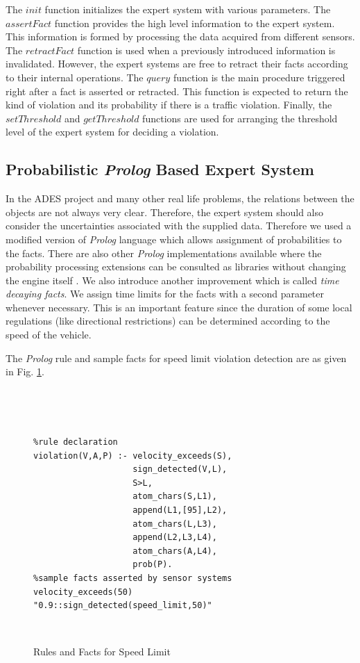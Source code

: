 \documentclass[letterpaper, 10 pt, conference]{ieeeconf}
\newenvironment{mylisting}
{~\par~\begin{list}{}{\setlength{\leftmargin}{1em}}\item\scriptsize\bfseries}
{\end{list}~\par}
\begin{document}
The $init$ function initializes the expert system with various parameters. The $assertFact$ function provides the high level information to the expert system. This information is formed by processing the data acquired from different sensors. The $retractFact$ function is used when a previously introduced information is invalidated. However, the expert systems are free to retract their facts according to their internal operations. The $query$ function is the main procedure triggered right after a fact is asserted or retracted. This function is expected to return the kind of violation and its probability if there is a traffic violation. Finally, the $setThreshold$ and $getThreshold$ functions are used for arranging the threshold level of the expert system for deciding a violation.


\subsection{Probabilistic \textit{Prolog} Based Expert System}

In the ADES project and many other real life problems, the relations between the objects are not always very clear. Therefore, the expert system should also consider the uncertainties associated with the supplied data. Therefore we used a modified version of \textit{Prolog} language which allows assignment of probabilities to the facts. There are also other \textit{Prolog} implementations available where the probability processing extensions can be consulted as libraries without changing the engine itself \cite{de2007problog}. We also introduce another improvement which is called \textit{time decaying facts}. We assign time limits for the facts with a second parameter whenever necessary. This is an important feature since the duration of some local regulations (like directional restrictions) can be determined according to the speed of the vehicle.

The \textit{Prolog} rule and sample facts for speed limit violation detection are as given in Fig. \ref{fig:rules}.

\begin{figure}[thb]
      \centering

\begin{mylisting}

\begin{verbatim}
%rule declaration
violation(V,A,P) :- velocity_exceeds(S),
                    sign_detected(V,L),
                    S>L,
                    atom_chars(S,L1),
                    append(L1,[95],L2),
                    atom_chars(L,L3),
                    append(L2,L3,L4),
                    atom_chars(A,L4),
                    prob(P).
%sample facts asserted by sensor systems 
velocity_exceeds(50)
"0.9::sign_detected(speed_limit,50)"
\end{verbatim}
\end{mylisting}

      \caption{Rules and Facts for Speed Limit}
      \label{fig:rules}
\end{figure}
\end{document}
